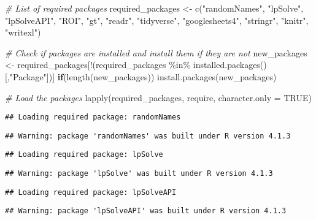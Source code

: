 \documentclass[
]{article}
\newenvironment{Shaded}{\begin{snugshade}}{\end{snugshade}}
\newcommand{\AttributeTok}[1]{\textcolor[rgb]{0.77,0.63,0.00}{#1}}
\newcommand{\CommentTok}[1]{\textcolor[rgb]{0.56,0.35,0.01}{\textit{#1}}}
\newcommand{\ConstantTok}[1]{\textcolor[rgb]{0.00,0.00,0.00}{#1}}
\newcommand{\ControlFlowTok}[1]{\textcolor[rgb]{0.13,0.29,0.53}{\textbf{#1}}}
\newcommand{\FunctionTok}[1]{\textcolor[rgb]{0.00,0.00,0.00}{#1}}
\newcommand{\NormalTok}[1]{#1}
\newcommand{\OtherTok}[1]{\textcolor[rgb]{0.56,0.35,0.01}{#1}}
\newcommand{\SpecialCharTok}[1]{\textcolor[rgb]{0.00,0.00,0.00}{#1}}
\newcommand{\StringTok}[1]{\textcolor[rgb]{0.31,0.60,0.02}{#1}}
\begin{document}
\begin{Shaded}
\begin{Highlighting}[]
\CommentTok{\# List of required packages}
\NormalTok{required\_packages }\OtherTok{\textless{}{-}} \FunctionTok{c}\NormalTok{(}\StringTok{"randomNames"}\NormalTok{, }\StringTok{"lpSolve"}\NormalTok{, }\StringTok{"lpSolveAPI"}\NormalTok{, }\StringTok{"ROI"}\NormalTok{, }\StringTok{"gt"}\NormalTok{, }\StringTok{"readr"}\NormalTok{, }\StringTok{"tidyverse"}\NormalTok{, }\StringTok{"googlesheets4"}\NormalTok{, }\StringTok{"stringr"}\NormalTok{, }\StringTok{"knitr"}\NormalTok{, }\StringTok{"writexl"}\NormalTok{)}

\CommentTok{\# Check if packages are installed and install them if they are not}
\NormalTok{new\_packages }\OtherTok{\textless{}{-}}\NormalTok{ required\_packages[}\SpecialCharTok{!}\NormalTok{(required\_packages }\SpecialCharTok{\%in\%} \FunctionTok{installed.packages}\NormalTok{()[,}\StringTok{"Package"}\NormalTok{])]}
\ControlFlowTok{if}\NormalTok{(}\FunctionTok{length}\NormalTok{(new\_packages)) }\FunctionTok{install.packages}\NormalTok{(new\_packages)}

\CommentTok{\# Load the packages}
\FunctionTok{lapply}\NormalTok{(required\_packages, require, }\AttributeTok{character.only =} \ConstantTok{TRUE}\NormalTok{)}
\end{Highlighting}
\end{Shaded}

\begin{verbatim}
## Loading required package: randomNames
\end{verbatim}

\begin{verbatim}
## Warning: package 'randomNames' was built under R version 4.1.3
\end{verbatim}

\begin{verbatim}
## Loading required package: lpSolve
\end{verbatim}

\begin{verbatim}
## Warning: package 'lpSolve' was built under R version 4.1.3
\end{verbatim}

\begin{verbatim}
## Loading required package: lpSolveAPI
\end{verbatim}

\begin{verbatim}
## Warning: package 'lpSolveAPI' was built under R version 4.1.3
\end{verbatim}
\end{document}
